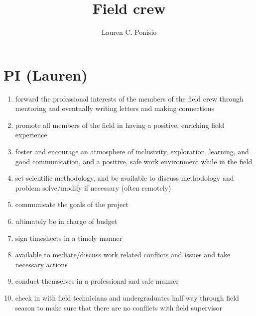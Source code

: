 \documentclass[12pt]{article}
\title{Field crew}
\author{Lauren C. Ponisio}
\begin{document}
\maketitle

\section{PI (Lauren)}
\begin{enumerate} 
\item forward the professional interests of the members of the field
  crew through mentoring and eventually writing letters and making
  connections 
\item promote all members of the field in having a positive, enriching
  field experience
\item foster and encourage an atmosphere of inclusivity, exploration,
  learning, and good communication, and a positive, safe work
  environment while in the field
\item set scientific methodology, and be available to discuss
  methodology and problem solve/modify if necessary (often remotely)
\item communicate the goals of the project
\item ultimately be in charge of budget
\item sign timesheets in a timely manner 
\item available to mediate/discuss work related conflicts and issues
  and take necessary actions
\item conduct themselves in a professional and safe manner
\item check in with field technicians and undergraduates half way through field season to make sure that there are no conflicts with field supervisor
\end{enumerate}
\end{document}
